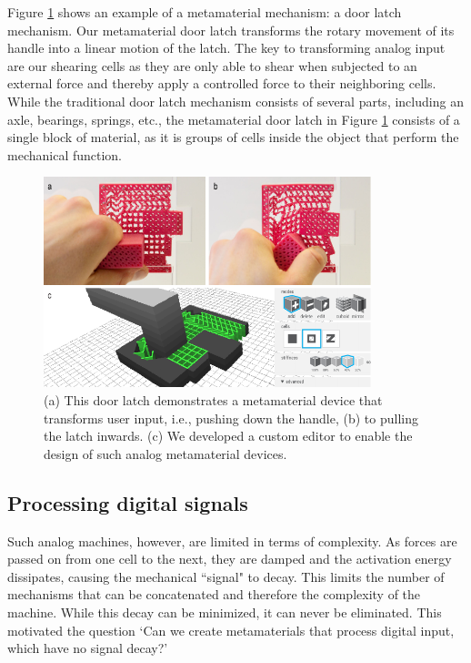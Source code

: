 Figure \ref{fig:2-overview-metamaterial-mechanisms} shows an example of a metamaterial mechanism: a door latch mechanism. Our metamaterial door latch transforms the rotary movement of its handle into a linear motion of the latch. The key to transforming analog input are our shearing cells as they are only able to shear when subjected to an external force and thereby apply a controlled force to their neighboring cells.  While the traditional door latch mechanism consists of several parts, including an axle, bearings, springs, etc., the metamaterial door latch in Figure \ref{fig:2-overview-metamaterial-mechanisms} consists of a single block of material, as it is groups of cells inside the object that perform the mechanical function.

\begin{figure} [h] %
    \centering
    \includegraphics[width=0.85\textwidth]{chapters/introduction-FIG/2-overview-metamaterial-mechanisms.pdf}
    \caption[Short figure name.]{(a) This door latch demonstrates a metamaterial device that transforms user input, i.e., pushing down the handle, (b) to pulling the latch inwards. (c) We developed a custom editor to enable the design of such analog metamaterial devices.
    \label{fig:2-overview-metamaterial-mechanisms}}
\end{figure}




\subsection{Processing digital signals}

Such analog machines, however, are limited in terms of complexity. As forces are passed on from one cell to the next, they are damped and the activation energy dissipates, causing the mechanical ``signal" to decay. This limits the number of mechanisms that can be concatenated and therefore the complexity of the machine. While this decay can be minimized, it can never be eliminated. This motivated the question `Can we create metamaterials that process digital input, which have no signal decay?' 

